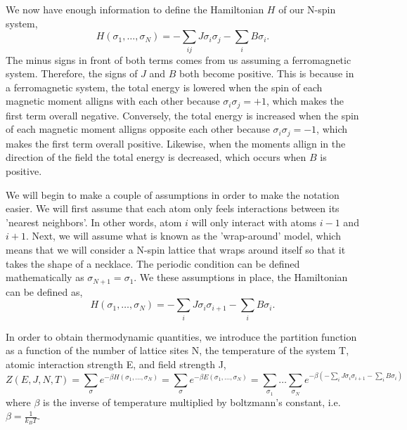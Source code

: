 \documentclass{article}
\newcommand{\be}{\begin{equation}}
\newcommand{\ee}{\end{equation}}
\begin{document}
We now have enough information to define the Hamiltonian $H$ of our N-spin system,
\be
  H(\sigma_1, \dots, \sigma_N) = - \sum_{ij} J \sigma_i \sigma_j - \sum_i B \sigma_i .
\ee
The minus signs in front of both terms comes from us assuming a ferromagnetic system.
Therefore, the signs of $J$ and $B$ both become positive.
This is because in a ferromagnetic system, the total energy is lowered when the spin of each magnetic moment alligns with each other because $\sigma_i \sigma_j = +1$, which makes the first term overall negative.
Conversely, the total energy is increased when the spin of each magnetic moment alligns opposite each other because $\sigma_i \sigma_j = -1$, which makes the first term overall positive.
Likewise, when the moments allign in the direction of the field the total energy is decreased, which occurs when $B$ is positive.

We will begin to make a couple of assumptions in order to make the notation easier.
We will first assume that each atom only feels interactions between its 'nearest neighbors'.
In other words, atom $i$ will only interact with atoms $i - 1$ and $i + 1$.
Next, we will assume what is known as the 'wrap-around' model, which means that we will consider a N-spin lattice that wraps around itself so that it takes the shape of a necklace.
The periodic condition can be defined mathematically as $\sigma_{N+1} = \sigma_1$.
We these assumptions in place, the Hamiltonian can be defined as,
\be
  H(\sigma_1, \dots, \sigma_N) = - \sum_{i} J \sigma_i \sigma_{i+1} - \sum_i B \sigma_i .
\ee

In order to obtain thermodynamic quantities, we introduce the partition function as a function of the number of lattice sites N, the temperature of the system T, atomic interaction strength E, and field strength J,
\be \label{eq:partition}
  Z(E, J, N, T) = \sum_{{\sigma}} e^{- \beta H(\sigma_1, \dots, \sigma_N)} = \sum_{{\sigma}} e^{- \beta E(\sigma_1, \dots, \sigma_N)} = \sum_{\sigma_1} \dots \sum_{\sigma_N} e^{- \beta( - \sum_{i} J \sigma_i \sigma_{i+1} - \sum_i B \sigma_i)}
\ee
where $\beta$ is the inverse of temperature multiplied by boltzmann's constant, i.e. $\beta = \frac{1}{k_B T}$.
\end{document}
